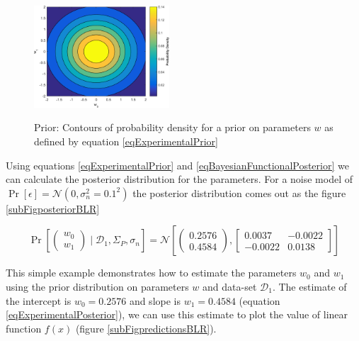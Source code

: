 \begin{figure}[!ht]
  \centering
            \includegraphics[width=0.45\textwidth]
        {images/part1/priorBLR}
        \label{subFigpriorBLR}
        \caption{Prior: Contours of probability density for a prior on parameters $w$ as defined by equation \ref{eqExperimentalPrior}}
\end{figure}

\begin{mdframed}[hidealllines=true,backgroundcolor=lightgray!20]
Using equations \ref{eqExperimentalPrior} and \ref{eqBayesianFunctionalPosterior} we can calculate the posterior distribution for the parameters. For a noise model of $\Pr[\epsilon] = \mathcal{N}(0, \sigma_{n}^2=0.1^2)$ the posterior distribution comes out as the figure \ref{subFigposteriorBLR}

\begin{equation}\label{eqExperimentalPosterior}
\Pr \left [\begin{pmatrix}
w_{0}\\ 
w_{1}
\end{pmatrix} \mid \mathcal{D}_{1}, \Sigma_{P}, \sigma_{n} \right ] = \mathcal{N}\left [ \begin{pmatrix}
0.2576\\ 
0.4584
\end{pmatrix}, \begin{bmatrix}
0.0037 & -0.0022\\ 
-0.0022 & 0.0138
\end{bmatrix} \right ]
\end{equation}

This simple example demonstrates how to estimate the parameters $w_{0}$ and $w_{1}$ using the prior distribution on parameters $w$ and data-set $\mathcal{D}_{1}$. The estimate of the intercept is $w_{0} = 0.2576$ and slope is $w_{1} = 0.4584$ (equation \ref{eqExperimentalPosterior}), we can use this estimate to plot the value of linear function $f(x)$ (figure \ref{subFigpredictionsBLR}). 
\end{mdframed}

